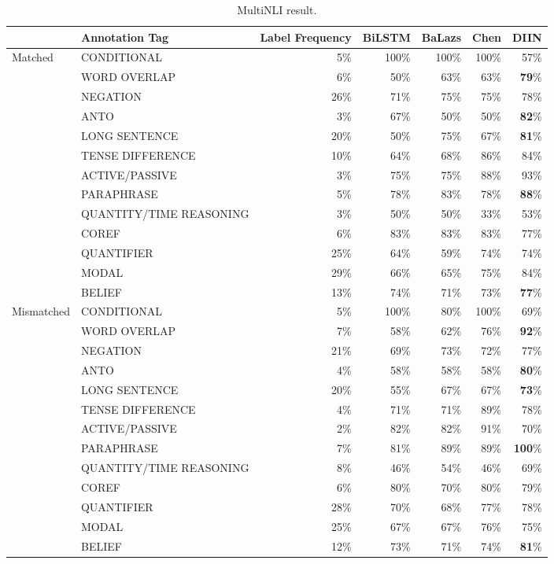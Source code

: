 \documentclass{article} \usepackage{iclr2018_conference,times}
\begin{document}
\begin{table*}[t]
\centering\scriptsize
\begin{tabular}{l l r r r r r}
\toprule
{} & {\bf Annotation Tag} & {\bf Label Frequency} & {\bf BiLSTM} & {\bf BaLazs} & {\bf Chen} & {\bf DIIN}\\
\midrule
\multirow{13}{*}{Matched}
{} & CONDITIONAL & 5\% & 100\% & 100\% & 100\% & 57\% \\
{} & {WORD OVERLAP} & 6\% & 50\% & 63\% & 63\% & \textbf{79}\% \\ 
{} & {NEGATION} & 26\% & 71\% & 75\% & 75\% & 78\% \\
{} & {ANTO} & 3\% & 67\% & 50\% & 50\% & \textbf{82}\% \\
{} & {LONG SENTENCE} & 20\% & 50\% & 75\% & 67\% & \textbf{81}\% \\
{} & {TENSE DIFFERENCE} & 10\% & 64\% & 68\% & 86\% & 84\% \\
{} & {ACTIVE/PASSIVE} & 3\% & 75\% & 75\% & 88\% & 93\% \\
{} & {PARAPHRASE} & 5\% & 78\% & 83\% & 78\% & \textbf{88}\% \\
{} & QUANTITY/TIME REASONING & 3\% & 50\% & 50\% & 33\% & 53\% \\
{} & {COREF} & 6\% & 83\% & 83\% & 83\% & 77\% \\
{} & {QUANTIFIER} & 25\% & 64\% & 59\% & 74\% & 74\% \\
{} & {MODAL} & 29\% & 66\% & 65\% & 75\% & 84\% \\
{} & {BELIEF} & 13\% & 74\% & 71\% & 73\% & \textbf{77}\% \\
\midrule
\multirow{13}{*}{Mismatched}
{} & CONDITIONAL & 5\% & 100\% & 80\% & 100\% & 69\% \\
{} & {WORD OVERLAP} & 7\% & 58\% & 62\% & 76\% & \textbf{92}\% \\ 
{} & {NEGATION} & 21\% & 69\% & 73\% & 72\% & 77\% \\
{} & {ANTO} & 4\% & 58\% & 58\% & 58\% & \textbf{80}\% \\
{} & {LONG SENTENCE} & 20\% & 55\% & 67\% & 67\% & \textbf{73}\% \\
{} & {TENSE DIFFERENCE} & 4\% & 71\% & 71\% & 89\% & 78\% \\
{} & {ACTIVE/PASSIVE} & 2\% & 82\% & 82\% & 91\% & 70\% \\
{} & {PARAPHRASE} & 7\% & 81\% & 89\% & 89\% & \textbf{100}\% \\
{} & QUANTITY/TIME REASONING & 8\% & 46\% & 54\% & 46\% & 69\% \\
{} & {COREF} & 6\% & 80\% & 70\% & 80\% & 79\% \\
{} & {QUANTIFIER} & 28\% & 70\% & 68\% & 77\% & 78\% \\
{} & {MODAL} & 25\% & 67\% & 67\% & 76\% & 75\% \\
{} & {BELIEF} & 12\% & 73\% & 71\% & 74\% & \textbf{81}\% \\
\bottomrule
\end{tabular}

\caption{MultiNLI result.\label{tab:annotation_tag_analysis}}
\end{table*}
\end{document}
